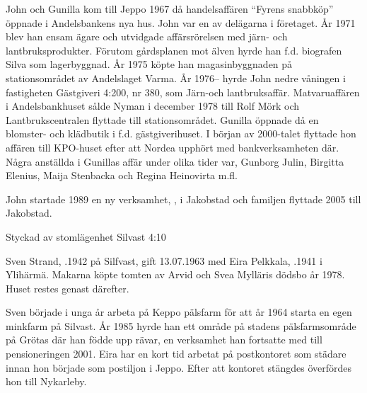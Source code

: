 John och Gunilla kom till Jeppo 1967 då handelsaffären ``Fyrens snabbköp'' öppnade i Andelsbankens nya hus. John var en av delägarna i företaget. År 1971 blev han ensam ägare och utvidgade affärsrörelsen med järn- och lantbruksprodukter. Förutom gårdsplanen mot älven hyrde han f.d. biografen Silva som lagerbyggnad. År 1975 köpte han magasinbyggnaden på stationsområdet av Andelslaget Varma. År 1976-- hyrde John nedre våningen i fastigheten Gästgiveri 4:200, nr 380, som Järn-och lantbruksaffär. Matvaruaffären i Andelsbankhuset sålde Nyman i december 1978 till Rolf Mörk och Lantbrukscentralen flyttade till stationsområdet. Gunilla öppnade då en blomster- och klädbutik i f.d. gästgiverihuset. I början av 2000-talet flyttade hon affären till KPO-huset efter att Nordea upphört med bankverksamheten där. Några anställda i Gunillas affär under olika tider var, Gunborg Julin, Birgitta Elenius, Maija Stenbacka och Regina Heinovirta m.fl.

John startade 1989 en ny verksamhet, , i Jakobstad och familjen flyttade 2005 till Jakobstad.



%

Styckad av stomlägenhet Silvast 4:10


%
Sven Strand, .1942 på Silfvast, gift 13.07.1963 med Eira Pelkkala, .1941 i Ylihärmä. Makarna köpte tomten av Arvid och Svea Mylläris dödsbo år 1978. Huset restes genast därefter.

Sven började i unga år arbeta på Keppo pälsfarm för att år 1964 starta en egen minkfarm på Silvast. År 1985 hyrde han ett område på stadens pälsfarmsområde på Grötas där han födde upp rävar, en verksamhet han fortsatte med till pensioneringen 2001. Eira har en kort tid arbetat på postkontoret som städare innan hon började som postiljon i Jeppo. Efter att kontoret stängdes överfördes hon till Nykarleby.
\begin{jhchildren}
  \item {}
  \item {}
\end{jhchildren}



